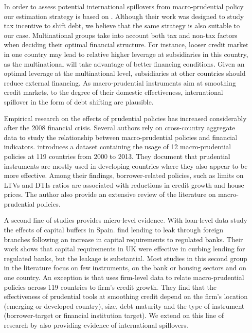 \documentclass[12pt]{article}
\begin{document}
	In order to assess potential international spillovers from macro-prudential policy our estimation strategy is based on \cite*{huizinga2008capital}. Although their work was designed to study tax incentive to shift debt, we believe that the same strategy is also suitable to our case. Multinational groups take into account both tax and non-tax factors when deciding their optimal financial structure. For instance, looser credit market in one country may lead to relative higher leverage at subsidiaries in this country, as the multinational will take advantage of better financing conditions. Given an optimal leverage at the multinational level, subsidiaries at other countries should reduce external financing. As macro-prudential instruments aim at smoothing credit markets, to the degree of their domestic effectiveness, international spillover in the form of debt shifting are plausible.
	
	Empirical research on the effects of prudential policies has increased considerably after the 2008 financial crisis. Several authors rely on cross-country aggregate data to study the relationship between macro-prudential policies and financial indicators. \cite*{cerutti2017use} introduces a dataset containing the usage of 12 macro-prudential policies at 119 countries from 2000 to 2013. They document that prudential instruments are mostly used in developing countries where they also appear to be more effective. Among their findings, borrower-related policies, such as limits on LTVs and DTIs ratios are associated with reductions in credit growth and house prices. The author also provide an extensive review of the literature on macro-prudential policies. 
	
	A second line of studies provides micro-level evidence. With loan-level data \cite*{jimenez2012macroprudential} study the  effects of capital buffers in Spain. \cite*{aiyar2014does} find lending to leak through foreign branches following an increase in capital requirements to regulated banks. Their work shows that capital requirements in UK were effective in curbing lending for regulated banks, but the leakage is substantial. Most studies in this second group in the literature focus on few instruments, on the bank or housing sectors and on one country. An exception is \cite*{ayyagari2017credit} that uses firm-level data to relate macro-prudential policies across 119 countries to firm's credit growth. They find that the effectiveness of prudential tools at smoothing credit depend on the firm's location (emerging or developed country), size, debt maturity and the type of instrument (borrower-target or financial institution target). We extend on this line of research by also providing evidence of international spillovers.
	
\end{document}
